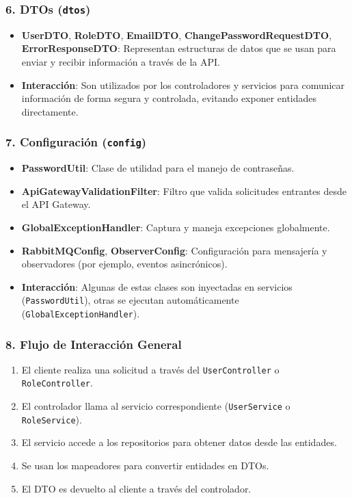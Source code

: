 \subsubsection*{6. DTOs (\texttt{dtos})}

\begin{itemize}
  \item \textbf{UserDTO}, \textbf{RoleDTO}, \textbf{EmailDTO}, \textbf{ChangePasswordRequestDTO}, \textbf{ErrorResponseDTO}: Representan estructuras de datos que se usan para enviar y recibir información a través de la API.
  \item \textbf{Interacción}: Son utilizados por los controladores y servicios para comunicar información de forma segura y controlada, evitando exponer entidades directamente.
\end{itemize}

\subsubsection*{7. Configuración (\texttt{config})}

\begin{itemize}
  \item \textbf{PasswordUtil}: Clase de utilidad para el manejo de contraseñas.
  \item \textbf{ApiGatewayValidationFilter}: Filtro que valida solicitudes entrantes desde el API Gateway.
  \item \textbf{GlobalExceptionHandler}: Captura y maneja excepciones globalmente.
  \item \textbf{RabbitMQConfig}, \textbf{ObserverConfig}: Configuración para mensajería y observadores (por ejemplo, eventos asincrónicos).
  \item \textbf{Interacción}: Algunas de estas clases son inyectadas en servicios (\texttt{PasswordUtil}), otras se ejecutan automáticamente (\texttt{GlobalExceptionHandler}).
\end{itemize}

\subsubsection*{8. Flujo de Interacción General}

\begin{enumerate}
  \item El cliente realiza una solicitud a través del \texttt{UserController} o \texttt{RoleController}.
  \item El controlador llama al servicio correspondiente (\texttt{UserService} o \texttt{RoleService}).
  \item El servicio accede a los repositorios para obtener datos desde las entidades.
  \item Se usan los mapeadores para convertir entidades en DTOs.
  \item El DTO es devuelto al cliente a través del controlador.
\end{enumerate}


